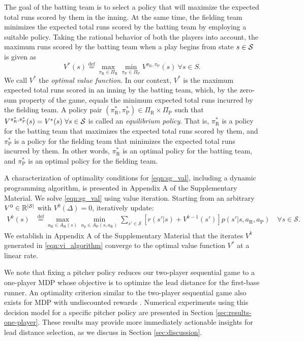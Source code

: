 \documentclass[aoas]{imsart}
\newcommand{\defeq}{\stackrel{\text{def}}{=}}
\newcommand{\abs}[1]{\left\lvert#1\right\rvert}
\begin{document}
    The goal of the batting team is to select a policy that will maximize the expected total runs scored by them in the inning. At the same time, the fielding team minimizes the expected total runs scored by the batting team by employing a suitable policy. Taking the rational behavior of both the players into account, the maximum runs scored by the batting team when a play begins from state $s \in {\cal S}$ is given as 
    \begin{equation}
    \label{eqn:sg_val}
      V^*(s) \defeq \max_{\pi_\text{R} \in \Pi_\text{R}}\min_{\pi_\text{P} \in \Pi_\text{P}}V^{\pi_\text{R},\pi_\text{P}}(s) \ \forall s \in S.
    \end{equation}
    We call $V^*$ the \textit{optimal value function}. In our context, $V^*$ is the maximum expected total runs scored in an inning by the batting team, which, by the zero-sum property of the game, equals the minimum expected total runs incurred by the fielding team. A policy pair $(\pi_\text{R}^*,\pi_\text{P}^*) \in \Pi_\text{R} \times \Pi_\text{P}$ such that $V^{\pi_\text{R}^*,\pi_\text{P}^*}(s) = V^*(s) \ \forall s \in {\cal S}$ is called an \textit{equilibrium policy}. That is, $\pi_\text{R}^*$ is a policy for the batting team that maximizes the expected total runs scored by them, and $\pi_\text{P}^*$ is a policy for the fielding team that minimizes the expected total runs incurred by them. In other words, $\pi_\text{R}^*$ is an optimal policy for the batting team, and $\pi_\text{P}^*$ is an optimal policy for the fielding team. 

    A characterization of optimality conditions for \eqref{eqn:sg_val}, including a dynamic programming algorithm, is presented in Appendix A of the Supplementary Material. We solve \eqref{eqn:sg_val} using value iteration. Starting from an arbitrary $V^0 \in \mathbb{R}^{\abs{\cal S}}$ with $V^0(\Delta) = 0$, iteratively update:
    \begin{align}
    \label{eqn:vi_algorithm}
      V^k(s) &\defeq \max_{a_\text{R} \in A_\text{R}(s)} \min_{a_\text{p} \in A_\text{P}(s,a_\text{R})}\sum_{s' \in \mathcal{S}}[r(s'|s) + V^{k-1}(s')] p(s'|s,a_\text{R},a_\text{P}) \quad \forall s \in \mathcal{S}.
    \end{align}
    We establish in Appendix A of the Supplementary Material that the iterates $V^k$ generated in \eqref{eqn:vi_algorithm} converge to the optimal value function $V^*$ at a linear rate.
    
    We note that fixing a pitcher policy reduces our two-player sequential game to a one-player MDP whose objective is to optimize the lead distance for the first-base runner. An optimality criterion similar to the two-player sequential game also exists for MDP with undiscounted rewards \citep[Section 7.2]{bertsekas_dynamic_2012}. Numerical experiments using this decision  model for a specific pitcher policy are presented in Section \ref{sec:results-one-player}. These results may provide more immediately actionable insights for lead distance selection, as we discuss in Section \ref{sec:discussion}.
\end{document}
